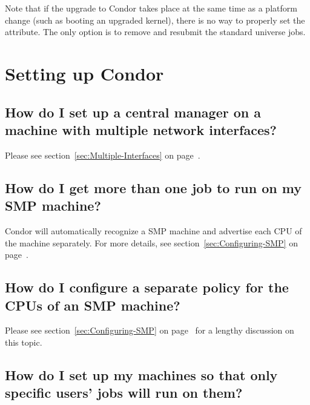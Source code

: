 Note that if the upgrade to Condor takes place at the same time
as a platform change (such as booting an upgraded kernel),
there is no way to properly set the  attribute.
The only option is to remove and resubmit the standard universe jobs.

\section{Setting up Condor}

\subsection*{How do I set up a central manager on a machine with multiple network interfaces?}

Please see section~\ref{sec:Multiple-Interfaces} on 
page~\pageref{sec:Multiple-Interfaces}.

\subsection*{How do I get more than one job to run on my SMP machine?}

Condor will automatically recognize a SMP machine and advertise each
CPU of the machine separately.
For more details, see section~\ref{sec:Configuring-SMP} on
page~\pageref{sec:Configuring-SMP}.

\subsection*{How do I configure a separate policy for the CPUs of an SMP machine?}

Please see section~\ref{sec:Configuring-SMP} on
page~\pageref{sec:Configuring-SMP} for a lengthy discussion on
this topic.

\subsection*{How do I set up my machines so that only specific users' jobs will run on them?}

